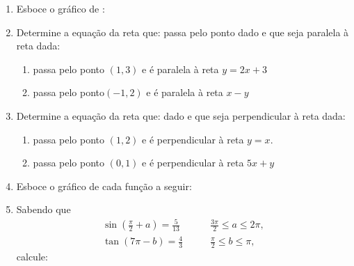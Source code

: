 \begin{enumerate}
\item Esboce o gráfico de :
\begin{enumerate}
\end{enumerate}




\item Determine a equação da reta que: passa pelo ponto dado e que seja paralela à reta dada:
\begin{enumerate}
    \item  passa pelo ponto $(1,3)$ e é paralela à reta $y=2x+3$
    \item passa pelo ponto$(-1,2)$ e é paralela à reta $x-y$
\end{enumerate}
\item Determine a equação da reta que:  dado e que seja perpendicular à reta dada:
\begin{enumerate}
    \item passa pelo ponto $(1,2)$ e é perpendicular à reta  $y=x$.
    \item passa pelo ponto $(0,1)$ e é perpendicular à reta $5x+y$
\end{enumerate}

\item Esboce o gráfico de cada função a seguir:
\begin{enumerate}
\end{enumerate}

\item Sabendo que
\begin{align*}
\sin(\frac{\pi}{2}+a)=\frac{5}{13} &\qquad \frac{3\pi}{2}\leq a \leq 2\pi,\\
\tan(7\pi -b)=\frac{4}{3} & \qquad \frac{\pi}{2}\leq b\leq \pi,
\end{align*}
calcule:
\begin{enumerate}
\end{enumerate}


\end{enumerate}
